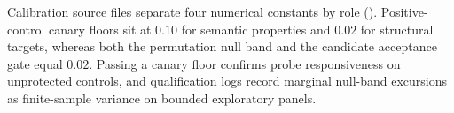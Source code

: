 Calibration source files separate four numerical constants by role
(). Positive-control canary floors sit at $0.10$ for semantic
properties and $0.02$ for structural targets, whereas both the permutation
null band and the candidate acceptance gate equal $0.02$. Passing a canary
floor confirms probe responsiveness on unprotected controls, and
qualification logs record marginal null-band excursions as finite-sample
variance on bounded exploratory panels.
